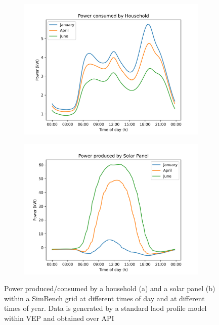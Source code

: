 \begin{figure}[H]
    \begin{subfigure}{.5\textwidth}
      \centering
      \includegraphics[width=\linewidth]{img/simbench/load_profile_household.png}
      \caption{}
      \label{fig:vep:load_profile_household}
    \end{subfigure}%
    \begin{subfigure}{.5\textwidth}
      \centering
      \includegraphics[width=\linewidth]{img/simbench/load_profile_solar.png}
      \caption{}
      \label{fig:vep:load_profile_solar}
    \end{subfigure}
    \caption{Power produced/consumed by a household (a) and a solar panel (b) within a SimBench grid at different times of day and at different times of year. Data is generated by a standard laod profile model within VEP and obtained over API\autocite{venios}}
    \label{fig:vep:load_profiles}
\end{figure}

